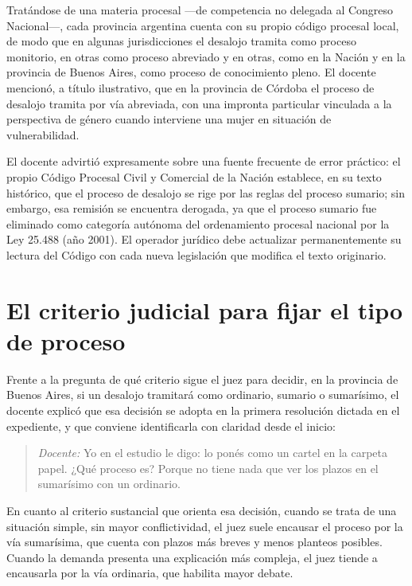 \documentclass[12pt,oneside]{book}
\begin{document}
Tratándose de una materia procesal —de competencia no delegada al Congreso Nacional—, cada provincia argentina cuenta con su propio código procesal local, de modo que en algunas jurisdicciones el desalojo tramita como proceso monitorio, en otras como proceso abreviado y en otras, como en la Nación y en la provincia de Buenos Aires, como proceso de conocimiento pleno. El docente mencionó, a título ilustrativo, que en la provincia de Córdoba el proceso de desalojo tramita por vía abreviada, con una impronta particular vinculada a la perspectiva de género cuando interviene una mujer en situación de vulnerabilidad.

\begin{important}
El docente advirtió expresamente sobre una fuente frecuente de error práctico: el propio Código Procesal Civil y Comercial de la Nación establece, en su texto histórico, que el proceso de desalojo se rige por las reglas del proceso sumario; sin embargo, esa remisión se encuentra derogada, ya que el proceso sumario fue eliminado como categoría autónoma del ordenamiento procesal nacional por la Ley 25.488 (año 2001). El operador jurídico debe actualizar permanentemente su lectura del Código con cada nueva legislación que modifica el texto originario.
\end{important}

\section{El criterio judicial para fijar el tipo de proceso}

Frente a la pregunta de qué criterio sigue el juez para decidir, en la provincia de Buenos Aires, si un desalojo tramitará como ordinario, sumario o sumarísimo, el docente explicó que esa decisión se adopta en la primera resolución dictada en el expediente, y que conviene identificarla con claridad desde el inicio:

\begin{quote}
\textit{Docente:} Yo en el estudio le digo: lo ponés como un cartel en la carpeta papel. ¿Qué proceso es? Porque no tiene nada que ver los plazos en el sumarísimo con un ordinario.
\end{quote}

En cuanto al criterio sustancial que orienta esa decisión, cuando se trata de una situación simple, sin mayor conflictividad, el juez suele encausar el proceso por la vía sumarísima, que cuenta con plazos más breves y menos planteos posibles. Cuando la demanda presenta una explicación más compleja, el juez tiende a encausarla por la vía ordinaria, que habilita mayor debate.
\end{document}
